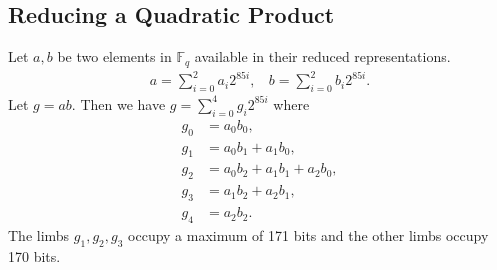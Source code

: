 \documentclass[a4paper, 12pt]{article}
\begin{document}
\subsection{Reducing a Quadratic Product}%
\label{subsec:reducing_a_quadratic_product}
Let $a,b$ be two elements in $\mathbb{F}_q$ available in their reduced representations.
\begin{align*}
  a = \sum^{2}_{i=0} a_i 2^{85i}, \ \ \ \ b = \sum^{2}_{i=0} b_i 2^{85i}.
\end{align*}
Let $g = ab$. Then we have $g = \sum_{i=0}^{4} g_i 2^{85i}$ where
\begin{align*}
  g_0 & = a_0b_0,\\
  g_1 & = a_0b_1 + a_1b_0,\\
  g_2 & = a_0b_2 + a_1b_1 + a_2b_0,\\
  g_3 & = a_1b_2 + a_2b_1,\\
  g_4 & = a_2b_2.
\end{align*}
The limbs $g_1,g_2,g_3$ occupy a maximum of 171 bits and the other limbs occupy 170 bits.
\end{document}
